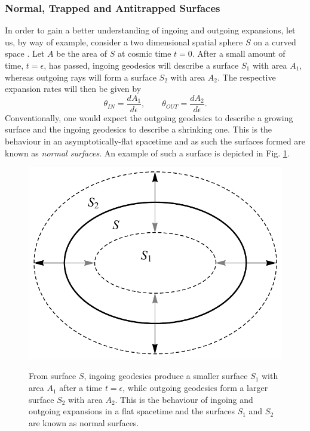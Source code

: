 \subsubsection*{Normal, Trapped and Antitrapped Surfaces}
In order to gain a better understanding of ingoing and outgoing expansions, let us, by way of example, consider a two dimensional spatial sphere $S$ on a curved space \cite{tHooft:2009bh}. Let $A$ be the area of $S$ at cosmic time $t=0$. After a small amount of time, $t=\epsilon$, has passed, ingoing geodesics will describe a surface $S_1$ with area $A_1$, whereas outgoing rays will form a surface $S_2$ with area $A_2$. The respective expansion rates will then be given by
\[
\theta_{IN}=\frac{dA_1}{d\epsilon},\qquad \theta_{OUT}=\frac{dA_2}{d\epsilon}
.\]
Conventionally, one would expect the outgoing geodesics to describe a growing surface and the ingoing geodesics to describe a shrinking one. This is the behaviour in an asymptotically-flat
spacetime and as such the surfaces formed are known as \emph{normal surfaces}. An example of such a surface is depicted in Fig. \ref{figexp}.
\begin{figure}[h]\cite{tHooft:2009bh}
\centering
\includegraphics[scale=0.4]{inout.pdf}
\caption{From surface $S$, ingoing geodesics produce a smaller surface $S_1$ with area $A_1$ after a time $t=\epsilon$, while outgoing geodesics form a larger surface $S_2$ with area $A_2$. This is the behaviour of ingoing and outgoing expansions in a flat spacetime and the surfaces $S_1$ and $S_2$ are known as normal surfaces.}\label{figexp} 
\end{figure}

